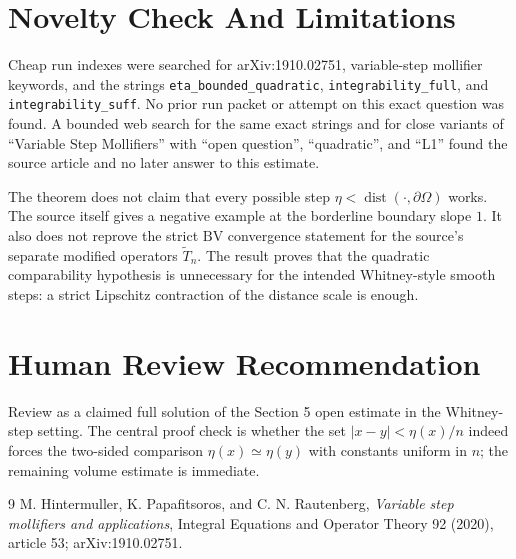 \documentclass[11pt]{article}
\newcommand{\dist}{\operatorname{dist}}
\begin{document}
\section*{Novelty Check And Limitations}

Cheap run indexes were searched for arXiv:1910.02751, variable-step
mollifier keywords, and the strings \texttt{eta\_bounded\_quadratic},
\texttt{integrability\_full}, and \texttt{integrability\_suff}.  No prior run
packet or attempt on this exact question was found.  A bounded web search for
the same exact strings and for close variants of ``Variable Step Mollifiers''
with ``open question'', ``quadratic'', and ``L1'' found the source article and
no later answer to this estimate.

The theorem does not claim that every possible step \(\eta<\dist(\cdot,
\partial\Omega)\) works.  The source itself gives a negative example at the
borderline boundary slope \(1\).  It also does not reprove the strict
\(\mathrm{BV}\) convergence statement for the source's separate modified
operators \(\tilde T_n\).  The result proves that the quadratic comparability
hypothesis is unnecessary for the intended Whitney-style smooth steps: a
strict Lipschitz contraction of the distance scale is enough.

\section*{Human Review Recommendation}

Review as a claimed full solution of the Section 5 open estimate in the
Whitney-step setting.  The central proof check is whether the set
\(|x-y|<\eta(x)/n\) indeed forces the two-sided comparison
\(\eta(x)\simeq\eta(y)\) with constants uniform in \(n\); the remaining
volume estimate is immediate.

\begin{thebibliography}{9}
M. Hintermuller, K. Papafitsoros, and C. N. Rautenberg,
\emph{Variable step mollifiers and applications},
Integral Equations and Operator Theory 92 (2020), article 53;
arXiv:1910.02751.
\end{thebibliography}
\end{document}
